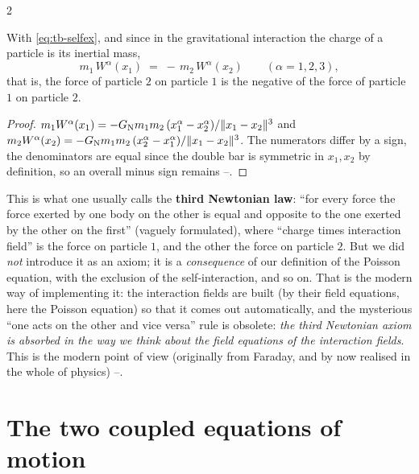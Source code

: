 \begin{paracol}{2}
\begin{theorem}\label{thm:tb-third}
With \eqref{eq:tb-selfex}, and since in the gravitational interaction the charge of a particle is its inertial mass,
\[
  m_1\,W^\alpha(x_1)\;=\;-\,m_2\,W^\alpha(x_2)\qquad(\alpha=1,2,3),
\]
that is, the force of particle $2$ on particle $1$ is the negative of the force of particle $1$ on particle $2$.
\end{theorem}
\begin{proof}
$m_1W^\alpha(x_1)=-G_{\rm N}m_1m_2\,(x_1^\alpha-x_2^\alpha)/\|x_1-x_2\|^3$ and $m_2W^\alpha(x_2)=-G_{\rm N}m_1m_2\,(x_2^\alpha-x_1^\alpha)/\|x_1-x_2\|^3$. The numerators differ by a sign, the denominators are equal since the double bar is symmetric in $x_1,x_2$ by definition, so an overall minus sign remains --.
\end{proof}
This is what one usually calls the \textbf{third Newtonian law}: ``for every force the force exerted by one body on the other is equal and opposite to the one exerted by the other on the first'' (vaguely formulated), where ``charge times interaction field'' is the force on particle $1$, and the other the force on particle $2$. But we did \emph{not} introduce it as an axiom; it is a \emph{consequence} of our definition of the Poisson equation, with the exclusion of the self-interaction, and so on.
That is the modern way of implementing it: the interaction fields are built (by their field equations, here the Poisson equation) so that it comes out automatically, and the mysterious ``one acts on the other and vice versa'' rule is obsolete: \emph{the third Newtonian axiom is absorbed in the way we think about the field equations of the interaction fields}. This is the modern point of view (originally from Faraday, and by now realised in the whole of physics) --.

\section{The two coupled equations of motion}\label{sec:tb-eom}


\end{paracol}
